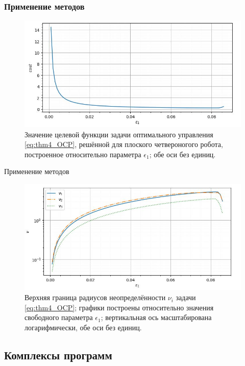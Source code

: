 \begin{frame}
	\frametitle{Применение методов}
	\begin{figure}
		\centering
		\includegraphics[scale=0.85]{images/mult_soft_cost_qp_eps.JPG}
		\caption{Значение целевой функции задачи оптимального управления \eqref{eq:thm4_OCP}, решённой для плоского четвероногого робота, построенное относительно параметра $\epsilon_1$; обе оси без единиц.}
		\label{fig:cost}
	\end{figure}
\end{frame}

\begin{frame}{Применение методов}
	\begin{figure}
		\centering
		\includegraphics[scale=0.8]{images/mult_soft_nu_eps_qp.JPG}
		\caption{Верхняя граница радиусов неопределённости $\nu_i$ задачи \eqref{eq:thm4_OCP}; графики построены относительно значения свободного параметра $\epsilon_1$; вертикальная ось масштабирована логарифмически, обе оси без единиц.}
		\label{fig:cost_qp}
	\end{figure}
\end{frame}

\subsection{Комплексы программ}

